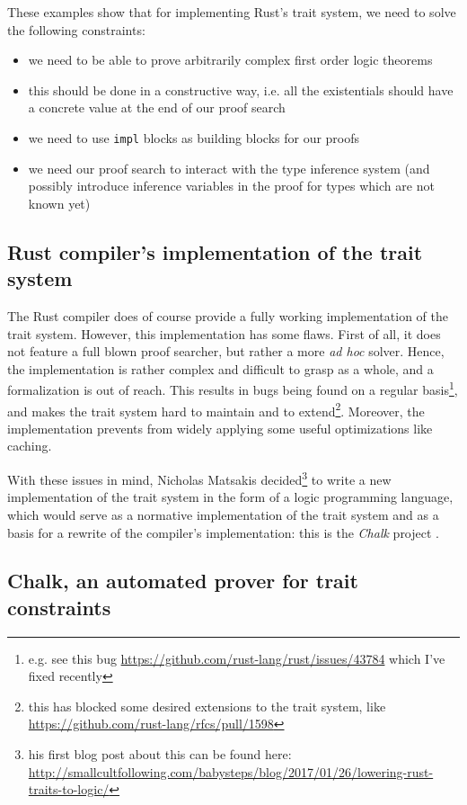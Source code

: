 \documentclass[twocolumn]{article}
\newcommand{\rust}[1]{\texttt{#1}}
\begin{document}
These examples show that for implementing Rust's trait system, we need to solve the following constraints:
\begin{itemize}
    \item we need to be able to prove arbitrarily complex first order logic theorems
    \item this should be done in a constructive way, i.e. all the existentials should have a concrete value at the end of our proof search
    \item we need to use \rust{impl} blocks as building blocks for our proofs
    \item we need our proof search to interact with the type inference system (and possibly introduce inference variables in the proof for types which are not known yet)
\end{itemize}

\subsection{Rust compiler's implementation of the trait system}

The Rust compiler does of course provide a fully working implementation of the trait system. However, this implementation has some flaws. First of all, it does not feature a full blown proof searcher, but rather a more \textit{ad hoc} solver. Hence, the implementation is rather complex and difficult to grasp as a whole, and a formalization is out of reach. This results in bugs being found on a regular basis\footnote{e.g. see this bug \url{https://github.com/rust-lang/rust/issues/43784} which I've fixed recently}, and makes the trait system hard to maintain and to extend\footnote{this has blocked some desired extensions to the trait system, like \url{https://github.com/rust-lang/rfcs/pull/1598}}. Moreover, the implementation prevents from widely applying some useful optimizations like caching.

With these issues in mind, Nicholas Matsakis decided\footnote{his first blog post about this can be found here: \url{http://smallcultfollowing.com/babysteps/blog/2017/01/26/lowering-rust-traits-to-logic/}} to write a new implementation of the trait system in the form of a logic programming language, which would serve as a normative implementation of the trait system and as a basis for a rewrite of the compiler's implementation: this is the \textit{Chalk} project \cite{chalk}.

\subsection{Chalk, an automated prover for trait constraints}
\end{document}
